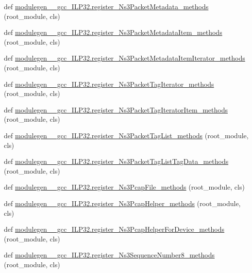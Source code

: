 \begin{DoxyCompactItemize}
\item 
def \hyperlink{namespacemodulegen____gcc__ILP32_a219b8e3d7145a4b09888203032e16df7}{modulegen\+\_\+\+\_\+gcc\+\_\+\+I\+L\+P32.\+register\+\_\+\+Ns3\+Packet\+Metadata\+\_\+methods} (root\+\_\+module, cls)
\item 
def \hyperlink{namespacemodulegen____gcc__ILP32_aa4a4a003c4a8b7886a31cb3d1b2f9062}{modulegen\+\_\+\+\_\+gcc\+\_\+\+I\+L\+P32.\+register\+\_\+\+Ns3\+Packet\+Metadata\+Item\+\_\+methods} (root\+\_\+module, cls)
\item 
def \hyperlink{namespacemodulegen____gcc__ILP32_af0c41f86c2c7e2875da9fd12e03ec3df}{modulegen\+\_\+\+\_\+gcc\+\_\+\+I\+L\+P32.\+register\+\_\+\+Ns3\+Packet\+Metadata\+Item\+Iterator\+\_\+methods} (root\+\_\+module, cls)
\item 
def \hyperlink{namespacemodulegen____gcc__ILP32_a9af269241fe2e52d9713c6fef73ade54}{modulegen\+\_\+\+\_\+gcc\+\_\+\+I\+L\+P32.\+register\+\_\+\+Ns3\+Packet\+Tag\+Iterator\+\_\+methods} (root\+\_\+module, cls)
\item 
def \hyperlink{namespacemodulegen____gcc__ILP32_a81cdb0716a2447fa9ebf30a8a43132d5}{modulegen\+\_\+\+\_\+gcc\+\_\+\+I\+L\+P32.\+register\+\_\+\+Ns3\+Packet\+Tag\+Iterator\+Item\+\_\+methods} (root\+\_\+module, cls)
\item 
def \hyperlink{namespacemodulegen____gcc__ILP32_a7f10f5444037901328380d4d5c08291a}{modulegen\+\_\+\+\_\+gcc\+\_\+\+I\+L\+P32.\+register\+\_\+\+Ns3\+Packet\+Tag\+List\+\_\+methods} (root\+\_\+module, cls)
\item 
def \hyperlink{namespacemodulegen____gcc__ILP32_aa623e91ff45aa8dce22ab35f70e26187}{modulegen\+\_\+\+\_\+gcc\+\_\+\+I\+L\+P32.\+register\+\_\+\+Ns3\+Packet\+Tag\+List\+Tag\+Data\+\_\+methods} (root\+\_\+module, cls)
\item 
def \hyperlink{namespacemodulegen____gcc__ILP32_a6f9559ad329fc07d113c60175da4c407}{modulegen\+\_\+\+\_\+gcc\+\_\+\+I\+L\+P32.\+register\+\_\+\+Ns3\+Pcap\+File\+\_\+methods} (root\+\_\+module, cls)
\item 
def \hyperlink{namespacemodulegen____gcc__ILP32_ad23ad74660470f64681b3cc1718dcff6}{modulegen\+\_\+\+\_\+gcc\+\_\+\+I\+L\+P32.\+register\+\_\+\+Ns3\+Pcap\+Helper\+\_\+methods} (root\+\_\+module, cls)
\item 
def \hyperlink{namespacemodulegen____gcc__ILP32_ab4a403fafcdf0b5d47126dcf02ee269f}{modulegen\+\_\+\+\_\+gcc\+\_\+\+I\+L\+P32.\+register\+\_\+\+Ns3\+Pcap\+Helper\+For\+Device\+\_\+methods} (root\+\_\+module, cls)
\item 
def \hyperlink{namespacemodulegen____gcc__ILP32_ae257fe051e77305c4009c4826569a611}{modulegen\+\_\+\+\_\+gcc\+\_\+\+I\+L\+P32.\+register\+\_\+\+Ns3\+Sequence\+Number8\+\_\+methods} (root\+\_\+module, cls)

\end{DoxyCompactItemize}
